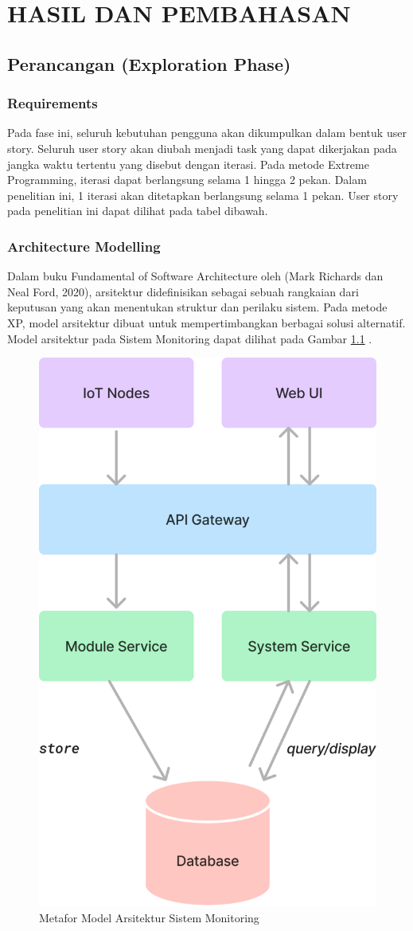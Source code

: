 \chapter{HASIL DAN PEMBAHASAN}

\section{Perancangan (Exploration Phase)}

\subsection{Requirements}

Pada fase ini, seluruh kebutuhan pengguna akan dikumpulkan dalam bentuk user story. Seluruh user story akan diubah menjadi task yang dapat dikerjakan pada jangka waktu tertentu yang disebut dengan iterasi. Pada metode Extreme Programming, iterasi dapat berlangsung selama 1 hingga 2 pekan. Dalam penelitian ini, 1 iterasi akan ditetapkan berlangsung selama 1 pekan. User story pada penelitian ini dapat dilihat pada tabel dibawah.



\subsection{Architecture Modelling}

Dalam buku Fundamental of Software Architecture oleh (Mark Richards dan Neal Ford, 2020), arsitektur didefinisikan sebagai sebuah rangkaian dari keputusan yang akan menentukan struktur dan perilaku sistem. Pada metode XP, model arsitektur dibuat untuk mempertimbangkan berbagai solusi alternatif. Model arsitektur pada Sistem Monitoring dapat dilihat pada Gambar \ref{fig:archi-model-sm} .

\begin{figure}[!h]
    \includegraphics[width=.4\linewidth, center]{images/hasil/archi-model.png}
    \caption{Metafor Model Arsitektur Sistem Monitoring}
    \label{fig:archi-model-sm}
\end{figure}

